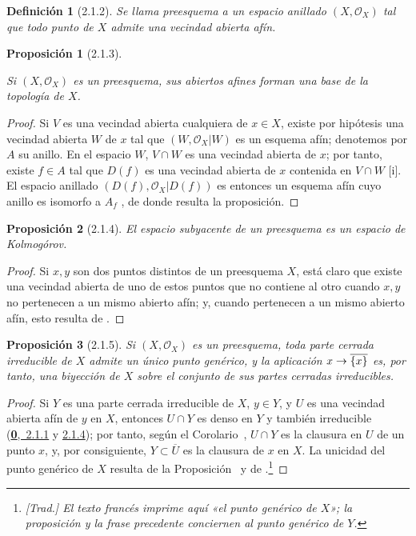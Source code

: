\documentclass[oneside]{amsart}
\theoremstyle{ega-env-style}
\theoremstyle{ega-thm-env-style}
\newtheorem*{proposition}{Proposición}
\theoremstyle{ega-defn-env-style}
\newtheorem*{definition}{Definición}
\renewcommand{\to}{\mathchoice{\longrightarrow}{\rightarrow}{\rightarrow}{\rightarrow}}
\newcommand{\oldpage}[2][]{{\marginnote{\normalfont{\textbf{#1}~|~#2}}}\ignorespaces}
\let\EGAOriginalLabel\label
\renewcommand{\label}[1]{\phantomsection\EGAOriginalLabel{#1}}
\begin{document}
\begin{definition}[2.1.2]
\label{I.2.1.2}
Se llama preesquema a un espacio anillado $(X,\mathscr{O}_X)$ tal que todo punto de $X$ admite una vecindad abierta afín.
\end{definition}


\oldpage[I]{98}
\begin{proposition}[2.1.3]
\label{I.2.1.3}

Si $(X,\mathscr{O}_X)$ es un preesquema, sus abiertos afines forman una base de la topología de $X$.
\end{proposition}

\begin{proof}
Si $V$ es una vecindad abierta cualquiera de $x\in X$, existe por hipótesis una vecindad abierta $W$ de $x$ tal que $(W,\mathscr{O}_X|W)$ es un esquema afín;
denotemos por $A$ su anillo.
En el espacio $W$, $V\cap W$ es una vecindad abierta de $x$;
por tanto, existe $f\in A$ tal que $D(f)$ es una vecindad abierta de $x$ contenida en $V\cap W$ [i].
El espacio anillado $(D(f),\mathscr{O}_X|D(f))$ es entonces un esquema afín cuyo anillo es isomorfo a $A_f$ , de donde resulta la proposición.
\end{proof}

\begin{proposition}[2.1.4]
\label{I.2.1.4}
El espacio subyacente de un preesquema es un espacio de Kolmogórov.
\end{proposition}

\begin{proof}
Si $x,y$ son dos puntos distintos de un preesquema $X$, está claro que existe una vecindad abierta de uno de estos puntos que no contiene al otro cuando $x,y$ no pertenecen a un mismo abierto afín; y, cuando pertenecen a un mismo abierto afín, esto resulta de .
\end{proof}

\begin{proposition}[2.1.5]
\label{I.2.1.5}
Si $(X,\mathscr{O}_X)$ es un preesquema, toda parte cerrada irreducible de $X$ admite un único punto genérico, y la aplicación $x\to\overline{\{x\}}$ es, por tanto, una biyección de $X$ sobre el conjunto de sus partes cerradas irreducibles.
\end{proposition}

\begin{proof}
Si $Y$ es una parte cerrada irreducible de $X$, $y\in Y$, y $U$ es una vecindad abierta afín de $y$ en $X$, entonces $U\cap Y$ es denso en $Y$ y también irreducible (\hyperref[0.2.1.1]{\textbf{0},~2.1.1} y \hyperref[0.2.1.4]{2.1.4});
por tanto, según el Corolario~, $U\cap Y$ es la clausura en $U$ de un punto $x$, y, por consiguiente, $Y\subset\overline{U}$ es la clausura de $x$ en $X$.
La unicidad del punto genérico de $X$ resulta de la Proposición~ y de .\footnote{\emph{[Trad.] El texto francés imprime aquí «el punto genérico de $X$»; la proposición y la frase precedente conciernen al punto genérico de $Y$.}}
\end{proof}
\end{document}
